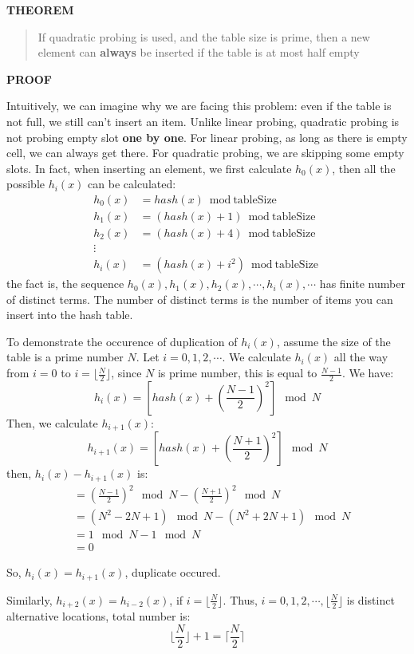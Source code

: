 \documentclass[11pt]{book}
\begin{document}
\textbf{THEOREM}
\begin{quote}
If quadratic probing is used, and the table size is prime, then a new element can \textbf{always} be inserted if the table is at most half empty
\end{quote}

\textbf{PROOF}

Intuitively, we can imagine why we are facing this problem: even if the table is not full, we still can't insert an item. Unlike linear probing, quadratic probing is not probing empty slot \textbf{one by one}. For linear probing, as long as there is empty cell, we can always get there. For quadratic probing, we are skipping some empty slots. In fact, when inserting an element, we first calculate \(h_0(x)\), then all the possible \(h_i(x)\) can be calculated:
\begin{align*}
h_0(x) &= hash(x) \bmod \text{tableSize} \\
h_1(x) &= (hash(x) + 1) \bmod \text{tableSize} \\
h_2(x) &= (hash(x) + 4) \bmod \text{tableSize} \\
\vdots \\
h_i(x) &= (hash(x) + i^2) \bmod \text{tableSize}
\end{align*}
the fact is, the sequence \(h_0(x), h_1(x), h_2(x), \cdots, h_i(x), \cdots\) has finite number of distinct terms. The number of distinct terms is the number of items you can insert into the hash table.

To demonstrate the occurence of duplication of \(h_i(x)\), assume the size of the table is a prime number \(N\). Let \(i = 0,1,2,\cdots\). We calculate \(h_i(x)\) all the way from \(i = 0\) to \(i = \lfloor \frac {N} {2} \rfloor\), since \(N\) is prime number, this is equal to \(\frac {N - 1} {2}\). We have:
\[
h_i(x) = [hash(x) + (\frac {N - 1} {2})^2] \mod N
\]
Then, we calculate \(h_{i + 1}(x)\):
\[
h_{i + 1}(x) = [hash(x) + (\frac {N + 1} {2})^2] \mod N
\]
then, \(h_i(x) - h_{i + 1}(x)\) is:
\begin{align*}
&= (\frac {N - 1} {2})^2 \mod N - (\frac {N + 1} {2})^2 \mod N \\
&= (N^2 - 2N + 1) \mod N - (N^2 + 2N + 1) \mod N \\
&= 1 \mod N - 1 \mod N \\
&= 0
\end{align*}

So, \(h_i(x) = h_{i + 1}(x)\), duplicate occured.

Similarly, \(h_{i + 2}(x) = h_{i - 2}(x)\), if \(i = \lfloor \frac {N} {2} \rfloor\). Thus, \(i = 0,1,2, \cdots, \lfloor \frac {N} {2} \rfloor\) is distinct alternative locations, total number is:
\[
\lfloor \frac {N} {2} \rfloor + 1 = \lceil \frac {N} {2} \rceil
\]
\end{document}
